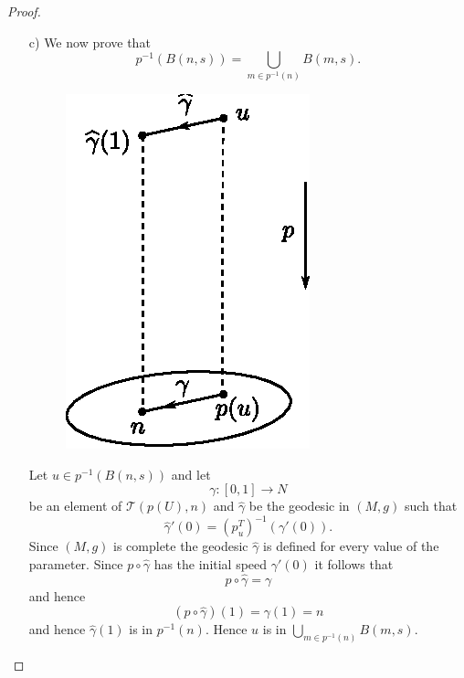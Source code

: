 \begin{proof}
\begin{itemize}
\item[\rm c)] We now prove that
$$
p^{-1}(B(n,s))=\bigcup_{m\in p^{-1}(n)}B(m,s).
$$
\begin{figure}[H]
\centering
\includegraphics{figures/chap7-fig8.eps}
\end{figure}

Let $u\in p^{-1}(B(n,s))$ and let
$$
\gamma:[0,1]\to N
$$
be an element of $\mathscr{T}(p(U),n)$ and $\widehat{\gamma}$ be the
geodesic in $(M,g)$ such that
$$
\widehat{\gamma}'(0)=(p^{T}_{u})^{-1}(\gamma'(0)).
$$
Since $(M,g)$ is complete the geodesic $\widehat{\gamma}$ is defined
for every value of the parameter. Since $p\circ\widehat{\gamma}$ has
the initial speed $\gamma'(0)$ it follows that
$$
p\circ\widehat{\gamma}=\gamma
$$
and hence
$$
(p\circ\widehat{\gamma})(1)=\gamma(1)=n
$$
and hence $\widehat{\gamma}(1)$ is in $p^{-1}(n)$. Hence $u$ is in
$\bigcup\limits_{m\in p^{-1}(n)}B(m,s)$. 
\end{itemize}
\end{proof}

\subsection{}\label{chap7:7.5.2}

